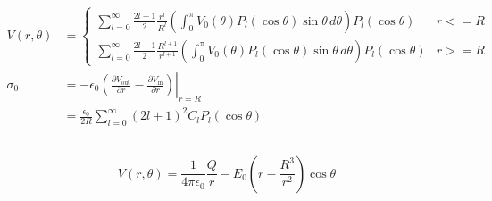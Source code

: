 \documentclass{article}
\newcommand{\ke}{\frac{1}{4 \pi \epsilon_0}}
\begin{document}
\subsection{}

\begin{align*}
  V(r, \theta) & = \begin{cases}
                     \sum_{l = 0}^\infty \frac{2 l + 1}{2} \frac{r^l}{R^l} \left( \int_0^\pi V_0(\theta) P_l(\cos \theta) \sin \theta \,d \theta \right) P_l(\cos \theta)             & r <= R \\
                     \sum_{l = 0}^\infty \frac{2 l + 1}{2} \frac{R^{l + 1}}{r^{l + 1}} \left( \int_0^\pi V_0(\theta) P_l(\cos \theta) \sin \theta \,d \theta \right) P_l(\cos \theta) & r >= R
                   \end{cases} \\
  \sigma_0     & = -\epsilon_0 \left. \left( \frac{\partial V_\text{out}}{\partial r} - \frac{\partial V_\text{in}}{\partial r} \right) \right|_{r = R}                                                                              \\
               & = \frac{\epsilon_0}{2 R} \sum_{l = 0}^\infty (2 l + 1)^2 C_l P_l(\cos \theta)
\end{align*}

\subsection{}

\[V(r, \theta) = \ke \frac{Q}{r} - E_0 \left( r - \frac{R^3}{r^2} \right) \cos \theta\]

\subsection{}
\end{document}
